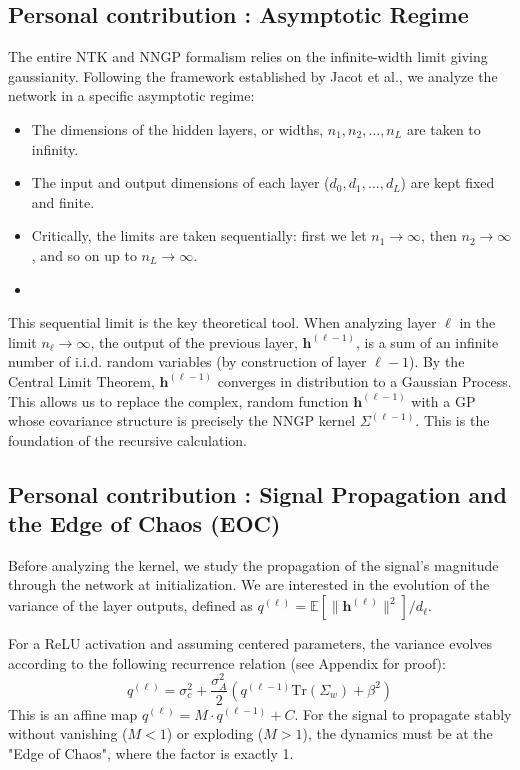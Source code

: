 \documentclass[a4paper]{article}
\theoremstyle{plain}
\theoremstyle{definition}
\theoremstyle{remark}
\begin{document}
\subsection{Personal contribution : Asymptotic Regime}
The entire NTK and NNGP formalism relies on the infinite-width limit giving gaussianity. Following the framework established by Jacot et al., we analyze the network in a specific asymptotic regime:
\begin{itemize}
    \item The dimensions of the hidden layers, or widths, $n_1, n_2, \dots, n_L$ are taken to infinity.
    \item The input and output dimensions of each layer ($d_0, d_1, \dots, d_L$) are kept fixed and finite.
    \item Critically, the limits are taken sequentially: first we let $n_1 \to \infty$, then $n_2 \to \infty$, and so on up to $n_L \to \infty$.
    \item 
\end{itemize}
\begin{tcolorbox}[colback=green!5,colframe=green!80!black,title={\textbf{Remark: Sequential Limit as Key Theoretical Tool}},enhanced,drop shadow,boxrule=2pt]
This sequential limit is the key theoretical tool. When analyzing layer $\ell$ in the limit $n_\ell \to \infty$, the output of the previous layer, $\bm{h}^{(\ell-1)}$, is a sum of an infinite number of i.i.d. random variables (by construction of layer $\ell-1$). By the Central Limit Theorem, $\bm{h}^{(\ell-1)}$ converges in distribution to a Gaussian Process. This allows us to replace the complex, random function $\bm{h}^{(\ell-1)}$ with a GP whose covariance structure is precisely the NNGP kernel $\Sigma^{(\ell-1)}$. This is the foundation of the recursive calculation.
\end{tcolorbox}

\subsection{Personal contribution : Signal Propagation and the Edge of Chaos (EOC)}
Before analyzing the kernel, we study the propagation of the signal's magnitude through the network at initialization. We are interested in the evolution of the variance of the layer outputs, defined as $q^{(\ell)} = \mathbb{E}[\|\bm{h}^{(\ell)}\|^2]/d_\ell$.

For a ReLU activation and assuming centered parameters, the variance evolves according to the following recurrence relation (see Appendix for proof):
\begin{equation}
    q^{(\ell)} = \sigma_c^2 + \frac{\sigma_A^2}{2} \left( q^{(\ell-1)}\text{Tr}(\Sigma_w) + \beta^2 \right)
\end{equation}
This is an affine map $q^{(\ell)} = M \cdot q^{(\ell-1)} + C$. For the signal to propagate stably without vanishing ($M<1$) or exploding ($M>1$), the dynamics must be at the "Edge of Chaos", where the factor is exactly 1.
\end{document}
